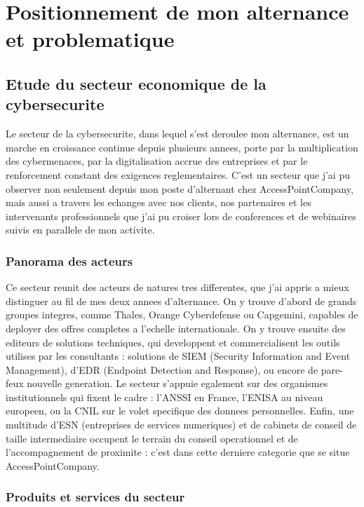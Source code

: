 \documentclass[11pt,a4paper]{article}
\begin{document}
\newpage

\section{Positionnement de mon alternance et problematique}

\subsection{Etude du secteur economique de la cybersecurite}

Le secteur de la cybersecurite, dans lequel s'est deroulee mon alternance, est un marche en croissance continue depuis plusieurs annees, porte par la multiplication des cybermenaces, par la digitalisation accrue des entreprises et par le renforcement constant des exigences reglementaires. C'est un secteur que j'ai pu observer non seulement depuis mon poste d'alternant chez AccessPointCompany, mais aussi a travers les echanges avec nos clients, nos partenaires et les intervenants professionnels que j'ai pu croiser lors de conferences et de webinaires suivis en parallele de mon activite.

\subsubsection*{Panorama des acteurs}

Ce secteur reunit des acteurs de natures tres differentes, que j'ai appris a mieux distinguer au fil de mes deux annees d'alternance. On y trouve d'abord de grands groupes integres, comme Thales, Orange Cyberdefense ou Capgemini, capables de deployer des offres completes a l'echelle internationale. On y trouve ensuite des editeurs de solutions techniques, qui developpent et commercialisent les outils utilises par les consultants : solutions de SIEM (Security Information and Event Management), d'EDR (Endpoint Detection and Response), ou encore de pare-feux nouvelle generation. Le secteur s'appuie egalement sur des organismes institutionnels qui fixent le cadre : l'ANSSI en France, l'ENISA au niveau europeen, ou la CNIL sur le volet specifique des donnees personnelles. Enfin, une multitude d'ESN (entreprises de services numeriques) et de cabinets de conseil de taille intermediaire occupent le terrain du conseil operationnel et de l'accompagnement de proximite : c'est dans cette derniere categorie que se situe AccessPointCompany.

\subsubsection*{Produits et services du secteur}
\end{document}
